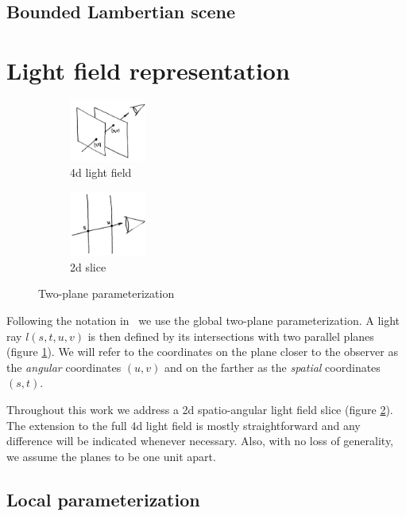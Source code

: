 \documentclass[acmtog,review,anonymous]{acmart}
\begin{document}
\subsection{Bounded Lambertian scene}

\section{Light field representation}

\begin{figure}[h]
  \centering
  \begin{subfigure}[t]{1in}
    \centering
    \includegraphics[width=1in]{figures/4dlf}
    \caption{4d light field}\label{fig:4dlf}
  \end{subfigure}
  \quad
  \begin{subfigure}[t]{1in}
    \centering
    \includegraphics[width=1in]{figures/2dslice}
    \caption{2d slice}\label{fig:2dslice}
  \end{subfigure}
  \caption{Two-plane parameterization}\label{fig:globalparam}
\end{figure}

Following the notation in~\cite{Levoy:1996:LFR:237170.237199,Gortler:1996:LUM:237170.237200} we use the global two-plane parameterization. A light ray $l(s, t, u, v)$ is then defined by its intersections with two parallel planes (figure \ref{fig:4dlf}). We will refer to the coordinates on the plane closer to the observer as the \emph{angular} coordinates $(u, v)$ and on the farther as the \emph{spatial} coordinates $(s, t)$.

Throughout this work we address a 2d spatio-angular light field slice (figure \ref{fig:2dslice}). The extension to the full 4d light field is mostly straightforward and any difference will be indicated whenever necessary. Also, with no loss of generality, we assume the planes to be one unit apart.

\subsection{Local parameterization}
\end{document}
